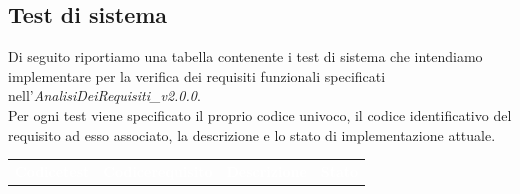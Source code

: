 \subsection{Test di sistema}
Di seguito riportiamo una tabella contenente i test di sistema che intendiamo implementare per la verifica dei requisiti funzionali specificati nell'\textit{AnalisiDeiRequisiti\_v2.0.0}. \\
Per ogni test viene specificato il proprio codice univoco, il codice identificativo del requisito ad esso associato, la descrizione e lo stato di implementazione attuale.
	\begin{longtable}{|>{\centering\arraybackslash}m{1.6cm}|>{\centering\arraybackslash}m{1.7cm}|m{6.41cm}|>{\centering\arraybackslash}m{3.1cm}|}		
		\rowcolor{LightBlue}
		\textbf{\textcolor{white}{Codice\newline test}}
		& \textbf{\textcolor{white}{Codice\newline requisito}}
		& \multicolumn{1}{|c|}{\textbf{\textcolor{white}{ Descrizione}}}
		& \textbf{\textcolor{white}{Stato}}\\
		

\end{longtable}

